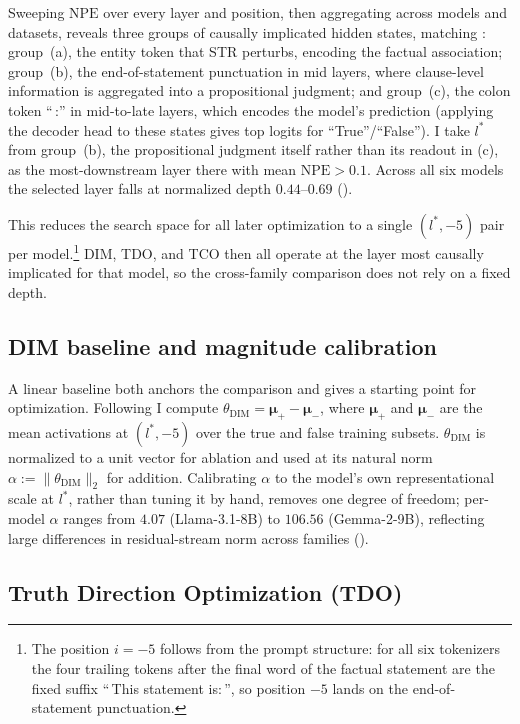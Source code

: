 \documentclass[sn-basic]{sn-jnl}
\newcommand{\bmu}{\boldsymbol{\mu}} \newcommand{\bnu}{\boldsymbol{\nu}}
\newcommand{\dimv}{\theta_{\text{DIM}}}
\begin{document}
Sweeping $\mathrm{NPE}$ over every layer and position, then aggregating across
models and datasets, reveals three groups of causally implicated hidden states,
matching \citet{marksGeometryTruthEmergent2024}: group~(a), the entity token
that STR perturbs, encoding the factual association; group~(b), the
end-of-statement punctuation in mid layers, where clause-level information is
aggregated into a propositional judgment; and group~(c), the colon token ``\,:''
in mid-to-late layers, which encodes the model's prediction (applying the
decoder head to these states gives top logits for ``True''/``False''). I take
$l^{*}$ from group~(b), the propositional judgment itself rather than its
readout in (c), as the most-downstream layer there with mean $\mathrm{NPE} >
0.1$. Across all six models the selected layer falls at normalized depth
$0.44$--$0.69$ ().



This reduces the search space for all later optimization to a single $(l^{*},
-5)$ pair per model.\footnote{The position $i = -5$ follows from the prompt
structure: for all six tokenizers the four trailing tokens after the final word
of the factual statement are the fixed suffix ``\,This statement is:\,'', so
position $-5$ lands on the end-of-statement punctuation.} DIM, TDO, and TCO then
all operate at the layer most causally implicated for that model, so the
cross-family comparison does not rely on a fixed depth.

\subsection{DIM baseline and magnitude calibration}
\label{sec:dim}
A linear baseline both anchors the comparison and gives a starting point for
optimization. Following \cite{marksGeometryTruthEmergent2024,
arditiRefusalLanguageModels2024} I compute $\dimv = \bmu_{+} - \bmu_{-}$, where
$\bmu_{+}$ and $\bmu_{-}$ are the mean activations at $(l^{*}, -5)$ over the
true and false training subsets. $\dimv$ is normalized to a unit vector for
ablation and used at its natural norm $\alpha := \|\dimv\|_{2}$ for addition.
Calibrating $\alpha$ to the model's own representational scale at $l^{*}$,
rather than tuning it by hand, removes one degree of freedom; per-model $\alpha$
ranges from $4.07$ (Llama-3.1-8B) to $106.56$ (Gemma-2-9B), reflecting large
differences in residual-stream norm across families ().

\subsection{Truth Direction Optimization (TDO)}
\label{sec:tdo}
\end{document}
